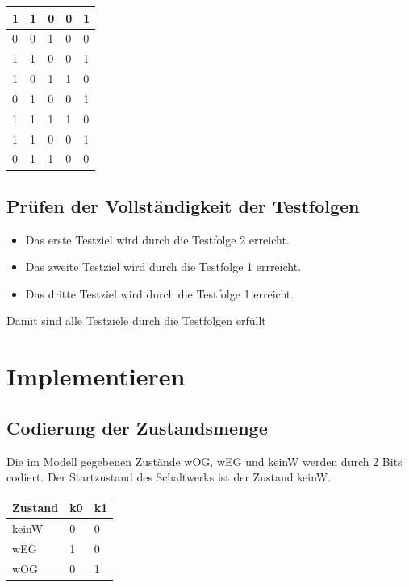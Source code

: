 \documentclass[a4paper,12pt,bibtotocnumbered]{scrartcl} %
\numberwithin{equation}{section} %
\begin{document}
\begin{table}[H]
\begin{tabular}{lllll}
		1          & 1          & \multicolumn{1}{l|}{0}      & 0             & 1              \\ \hline
		0          & 0          & \multicolumn{1}{l|}{1}      & 0             & 0              \\ \hline
		1          & 1          & \multicolumn{1}{l|}{0}      & 0             & 1              \\ \hline
		1          & 0          & \multicolumn{1}{l|}{1}      & 1             & 0              \\ \hline
		0          & 1          & \multicolumn{1}{l|}{0}      & 0             & 1              \\ \hline
		1          & 1          & \multicolumn{1}{l|}{1}      & 1             & 0              \\ \hline
		1          & 1          & \multicolumn{1}{l|}{0}      & 0             & 1              \\ \hline
		0          & 1          & \multicolumn{1}{l|}{1}      & 0             & 0              \\ \hline
	\end{tabular}
\end{table}

\subsection{Prüfen der Vollständigkeit der Testfolgen}

\begin{itemize}
	\item Das erste Testziel wird durch die Testfolge 2 erreicht.
	\item Das zweite Testziel wird durch die Testfolge 1 errreicht.
	\item Das dritte Testziel wird durch die Testfolge 1 erreicht.
\end{itemize}

Damit sind alle Testziele durch die Testfolgen erfüllt

\section{Implementieren}
\subsection{Codierung der Zustandsmenge}
Die im Modell gegebenen Zustände wOG, wEG und keinW werden durch 2 Bits codiert.
Der Startzustand des Schaltwerks ist der Zustand keinW.
\begin{table}[H]
	\begin{tabular}{l|ll}
		Zustand & k0 & k1 \\ \hline
		keinW   & 0  & 0  \\
		wEG     & 1  & 0  \\
		wOG     & 0  & 1
	\end{tabular}
\end{table}
\end{document}
